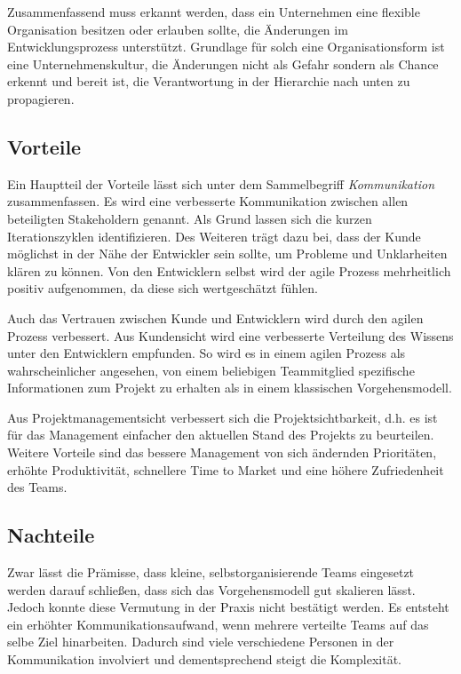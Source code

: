 Zusammenfassend muss erkannt werden, dass ein Unternehmen eine flexible Organisation besitzen oder erlauben sollte, die Änderungen im Entwicklungsprozess unterstützt.
Grundlage für solch eine Organisationsform ist eine Unternehmenskultur, die Änderungen nicht als Gefahr sondern als Chance erkennt und bereit ist, die Verantwortung in der Hierarchie nach unten zu propagieren.

\subsection{Vorteile} %

Ein Hauptteil der Vorteile lässt sich unter dem Sammelbegriff \emph{Kommunikation} zusammenfassen.
Es wird eine verbesserte Kommunikation zwischen allen beteiligten Stakeholdern genannt.
Als Grund lassen sich die kurzen Iterationszyklen identifizieren. 
Des Weiteren trägt dazu bei, dass der Kunde möglichst in der Nähe der Entwickler sein sollte, um Probleme und Unklarheiten klären zu können.
Von den Entwicklern selbst wird der agile Prozess mehrheitlich positiv aufgenommen, da diese sich wertgeschätzt fühlen.
\parencite[Vgl.][S. 658]{Petersen:2010aa}

Auch das Vertrauen zwischen Kunde und Entwicklern wird durch den agilen Prozess verbessert.
Aus Kundensicht wird eine verbesserte Verteilung des Wissens unter den Entwicklern empfunden.
So wird es in einem agilen Prozess als wahrscheinlicher angesehen, von einem beliebigen Teammitglied spezifische Informationen zum Projekt zu erhalten als in einem klassischen Vorgehensmodell.
\parencite[Vgl.][S. 498 f.]{Bomarius:2005aa}

Aus Projektmanagementsicht verbessert sich die Projektsichtbarkeit, d.h. es ist für das Management einfacher den aktuellen Stand des Projekts zu beurteilen.
Weitere Vorteile sind das bessere Management von sich ändernden Prioritäten, erhöhte Produktivität, schnellere Time to Market und eine höhere Zufriedenheit des Teams.
\parencite[Vgl.][]{VersionOne:2015aa}

\subsection{Nachteile} %

Zwar lässt die Prämisse, dass kleine, selbstorganisierende Teams eingesetzt werden darauf schließen, dass sich das Vorgehensmodell gut skalieren lässt. 
Jedoch konnte diese Vermutung in der Praxis nicht bestätigt werden. 
Es entsteht ein erhöhter Kommunikationsaufwand, wenn mehrere verteilte Teams auf das selbe Ziel hinarbeiten.
Dadurch sind viele verschiedene Personen in der Kommunikation involviert und dementsprechend steigt die Komplexität.

